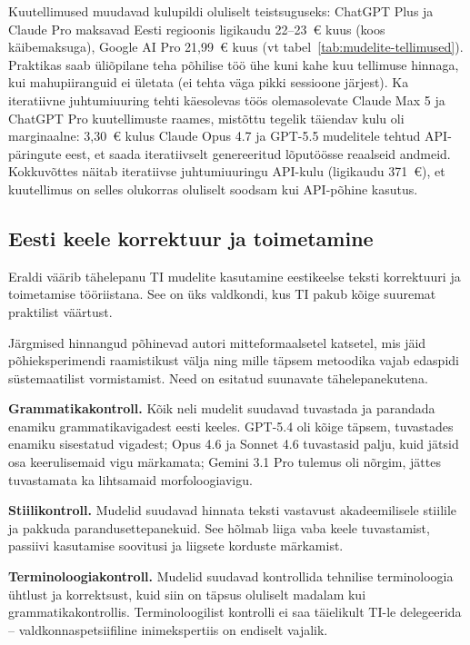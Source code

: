 Kuutellimused muudavad kulupildi oluliselt teistsuguseks: ChatGPT Plus ja Claude Pro maksavad Eesti regioonis ligikaudu 22--23~€ kuus (koos käibemaksuga), Google AI Pro 21,99~€ kuus (vt tabel~\ref{tab:mudelite-tellimused}). Praktikas saab üliõpilane teha põhilise töö ühe kuni kahe kuu tellimuse hinnaga, kui mahupiiranguid ei ületata (ei tehta väga pikki sessioone järjest). Ka iteratiivne juhtumiuuring tehti käesolevas töös olemasolevate Claude Max 5\texttimes{} ja ChatGPT Pro kuutellimuste raames, mistõttu tegelik täiendav kulu oli marginaalne: 3,30~€ kulus Claude Opus 4.7 ja GPT-5.5 mudelitele tehtud API-päringute eest, et saada iteratiivselt genereeritud lõputöösse reaalseid andmeid. Kokkuvõttes näitab iteratiivse juhtumiuuringu API-kulu (ligikaudu 371~€), et kuutellimus on selles olukorras oluliselt soodsam kui API-põhine kasutus.

\subsection{Eesti keele korrektuur ja toimetamine} \label{subsec:korrektuur}

Eraldi väärib tähelepanu TI mudelite kasutamine eestikeelse teksti korrektuuri ja toimetamise tööriistana. See on üks valdkondi, kus TI pakub kõige suuremat praktilist väärtust.

Järgmised hinnangud põhinevad autori mitteformaalsetel katsetel, mis jäid põhieksperimendi raamistikust välja ning mille täpsem metoodika vajab edaspidi süstemaatilist vormistamist. Need on esitatud suunavate tähelepanekutena.

\textbf{Grammatikakontroll.} Kõik neli mudelit suudavad tuvastada ja parandada enamiku grammatikavigadest eesti keeles. GPT-5.4 oli kõige täpsem, tuvastades enamiku sisestatud vigadest; Opus 4.6 ja Sonnet 4.6 tuvastasid palju, kuid jätsid osa keerulisemaid vigu märkamata; Gemini 3.1 Pro tulemus oli nõrgim, jättes tuvastamata ka lihtsamaid morfoloogiavigu.

\textbf{Stiilikontroll.} Mudelid suudavad hinnata teksti vastavust akadeemilisele stiilile ja pakkuda parandusettepanekuid. See hõlmab liiga vaba keele tuvastamist, passiivi kasutamise soovitusi ja liigsete korduste märkamist.

\textbf{Terminoloogiakontroll.} Mudelid suudavad kontrollida tehnilise terminoloogia ühtlust ja korrektsust, kuid siin on täpsus oluliselt madalam kui grammatikakontrollis. Terminoloogilist kontrolli ei saa täielikult TI-le delegeerida -- valdkonnaspetsiifiline inimekspertiis on endiselt vajalik.

